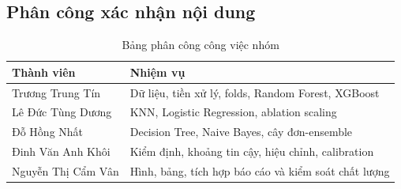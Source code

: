 \documentclass[12pt]{template/ai_conquer2026}
\begin{document}
\begin{appendices}
\section{Phân công xác nhận nội dung}
\label{app:owner}

\begin{table}[H]\centering
\caption{Bảng phân công công việc nhóm}
\label{tab:owner}
\begin{tabularx}{\linewidth}{lX}\toprule
Thành viên & Nhiệm vụ\\\midrule
Trương Trung Tín & Dữ liệu, tiền xử lý, folds, Random Forest, XGBoost\\
Lê Đức Tùng Dương & KNN, Logistic Regression, ablation scaling\\
Đỗ Hồng Nhất & Decision Tree, Naive Bayes, cây đơn-ensemble\\
Đinh Văn Anh Khôi & Kiểm định, khoảng tin cậy, hiệu chỉnh, calibration\\
Nguyễn Thị Cẩm Vân & Hình, bảng, tích hợp báo cáo và kiểm soát chất lượng\\\bottomrule
\end{tabularx}\end{table}
\end{appendices}
\end{document}
